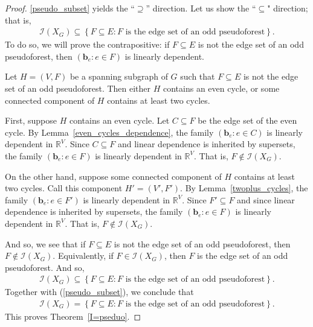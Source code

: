 \documentclass[12pt]{article}
\theoremstyle{definition}
\theoremstyle{remark}
\newcommand{\set}[1]{\left\{ #1 \right\}}
\newcommand{\tup}[1]{\left( #1 \right)}
\begin{document}
\begin{proof}
    \eqref{pseudo_subset} yields the ``$\supseteq$'' direction. Let us show the ``$\subseteq$" direction; that is, 
        \begin{align*}\mathcal{I}(X_G) \subseteq \set{F \subseteq E : F \text{ is the edge set of an odd pseudoforest}}.
    \end{align*} To do so, we will prove the contrapositive: if $F \subseteq E$ is not the edge set of an odd pseudoforest, then $\tup{\mathbf{b}_e : e \in F}$ is linearly dependent.

    Let $H=(V,F)$ be a spanning subgraph of $G$ such that $F \subseteq E$ is not the edge set of an odd pseudoforest. Then either $H$ contains an even cycle, or some connected component of $H$ contains at least two cycles.

    First, suppose $H$ contains an even cycle. Let $C \subseteq F$ be the edge set of the even cycle. By Lemma~\ref{even_cycles_dependence}, the family $\tup{\mathbf{b}_e : e \in C}$ is linearly dependent in $\mathbb{R}^V$. Since $C \subseteq F$ and linear dependence is inherited by supersets, the family $\tup{\mathbf{b}_e : e \in F}$ is linearly dependent in $\mathbb{R}^V$. That is, $F \notin \mathcal{I}(X_G)$.

    On the other hand, suppose some connected component of $H$ contains at least two cycles. Call this component $H' = (V',F')$. By Lemma~\ref{twoplus_cycles}, the family $\tup{\mathbf{b}_e : e \in F'}$ is linearly dependent in $\mathbb{R}^V$.
    Since $F' \subseteq F$ and since linear dependence is inherited by supersets, the family $\tup{\mathbf{b}_e : e \in F}$ is linearly dependent in $\mathbb{R}^V$. That is, $F \notin \mathcal{I}(X_G)$.

    And so, we see that if $F\subseteq E$ is not the edge set of an odd pseudoforest, then $F \notin \mathcal{I}(X_G)$. Equivalently, if $F \in \mathcal{I}(X_G)$, then $F$ is the edge set of an odd pseudoforest. And so,  \begin{align*}
        \mathcal{I}(X_G) \subseteq \set{F \subseteq E : F \text{ is the edge set of an odd pseudoforest}}.
    \end{align*} Together with (\ref{pseudo_subset}), we conclude that \begin{align*}
        \mathcal{I}(X_G) = \set{F \subseteq E: F \text{ is the edge set of an odd pseudoforest}}.
    \end{align*} This proves Theorem~\ref{I=pseduo}.
\end{proof}
\end{document}

